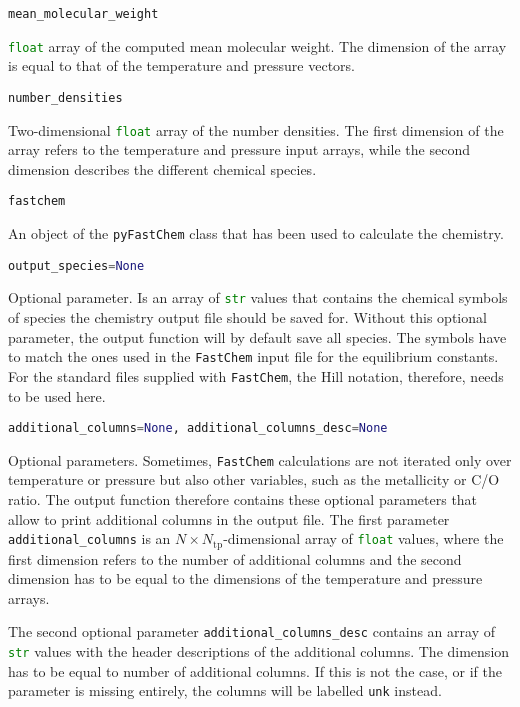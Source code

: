 \documentclass[numbers=noenddot]{aux/fcmanual}
\newcommand{\fc}{\texttt{FastChem}\xspace}
\newcommand{\pfc}{\texttt{pyFastChem}\xspace}
\begin{document}
\bigbreak

\lstinline[language=Python]!mean_molecular_weight!
\begin{addmargin}[25pt]{0pt}
	\lstinline[language=Python]!float! array of the computed mean molecular weight. The dimension of the array is equal to that of the temperature and pressure vectors.
\end{addmargin}


\bigbreak

\lstinline[language=Python]!number_densities!
\begin{addmargin}[25pt]{0pt}
	Two-dimensional \lstinline[language=Python]!float! array of the number densities. The first dimension of the array refers to the temperature and pressure input arrays, while the second dimension describes the different chemical species.
\end{addmargin}


\bigbreak

\lstinline[language=Python]!fastchem!
\begin{addmargin}[25pt]{0pt}
	An object of the \pfc class that has been used to calculate the chemistry. 
\end{addmargin}


\bigbreak

\lstinline[language=Python]!output_species=None!
\begin{addmargin}[25pt]{0pt}
	Optional parameter. Is an array of \lstinline[language=Python]!str! values that contains the chemical symbols of species the chemistry output file should be saved for. Without this optional parameter, the output function will by default save all species. The symbols have to match the ones used in the \fc input file for the equilibrium constants. For the standard files supplied with \fc, the Hill notation, therefore, needs to be used here.
\end{addmargin}

\bigbreak

\lstinline[language=Python]!additional_columns=None, additional_columns_desc=None!
\begin{addmargin}[25pt]{0pt}
	Optional parameters. Sometimes, \fc calculations are not iterated only over temperature or pressure but also other variables, such as the metallicity or C/O ratio. The output function therefore contains these optional parameters that allow to print additional columns in the output file. The first parameter \lstinline[language=Python]!additional_columns! is an $N\times N_\mathrm{tp}$-dimensional array of \lstinline[language=Python]!float! values, where the first dimension refers to the number of additional columns and the second dimension has to be equal to the dimensions of the temperature and pressure arrays. 
	
	The second optional parameter \lstinline[language=Python]!additional_columns_desc! contains an array of \lstinline[language=Python]!str! values with the header descriptions of the additional columns. The dimension has to be equal to number of additional columns. If this is not the case, or if the parameter is missing entirely, the columns will be labelled \texttt{unk} instead.
\end{addmargin}
\end{document}
